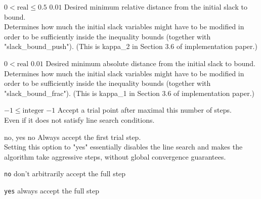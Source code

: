 %
{$0<\textrm{real}\leq0.5$}%
{$0.01$}%
{Desired minimum relative distance from the initial slack to bound.\\
Determines how much the initial slack variables might have to be modified in order to be sufficiently inside the inequality bounds (together with "slack\_bound\_push").  (This is kappa\_2 in Section 3.6 of implementation paper.)}%
{}

%
{$0<\textrm{real}$}%
{$0.01$}%
{Desired minimum absolute distance from the initial slack to bound.\\
Determines how much the initial slack variables might have to be modified in order to be sufficiently inside the inequality bounds (together with "slack\_bound\_frac").  (This is kappa\_1 in Section 3.6 of implementation paper.)}%
{}

%
{$-1\leq\textrm{integer}$}%
{$-1$}%
{Accept a trial point after maximal this number of steps.\\
Even if it does not satisfy line search conditions.}%
{}

%
{\ttfamily no, yes}%
{no}%
{Always accept the first trial step.\\
Setting this option to "yes" essentially disables the line search and makes the algorithm take aggressive steps, without global convergence guarantees.}%
{\begin{list}{}{
\setlength{\parsep}{0em}
\setlength{\leftmargin}{5ex}
\setlength{\labelwidth}{2ex}
\setlength{\itemindent}{0ex}
\setlength{\topsep}{0pt}}
\item[\texttt{no}] don't arbitrarily accept the full step
\item[\texttt{yes}] always accept the full step
\end{list}
}

